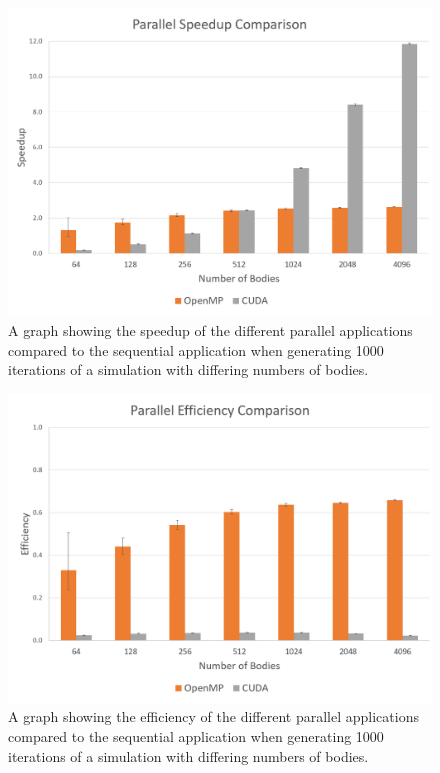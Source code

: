 \documentclass[12pt,journal,transmag]{IEEEtran}
\begin{document}
	\begin{figure}[!h]
		\centering
		\includegraphics[width=1.6\columnwidth]{IMAGES/speedupcomp}
		\caption{A graph showing the speedup of the different parallel applications compared to the sequential application when generating 1000 iterations of a simulation with differing numbers of bodies.}
		\label{graph3}
	\end{figure}
	
	\begin{figure}[!h]
		\centering
		\includegraphics[width=1.6\columnwidth]{IMAGES/effcomp}
		\caption{A graph showing the efficiency of the different parallel applications compared to the sequential application when generating 1000 iterations of a simulation with differing numbers of bodies.}
		\label{graph4}
	\end{figure}
\end{document}
